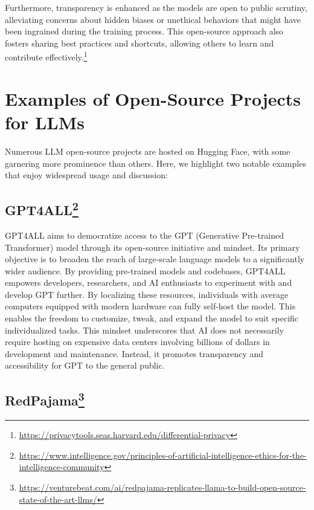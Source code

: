 \documentclass[
]{book}
\begin{document}
Furthermore, transparency is enhanced as the models are open to public scrutiny, alleviating concerns about hidden biases or unethical behaviors that might have been ingrained during the training process. This open-source approach also fosters sharing best practices and shortcuts, allowing others to learn and contribute effectively.\footnote{\url{https://privacytools.seas.harvard.edu/differential-privacy}}

\hypertarget{examples-of-open-source-projects-for-llms}{%
\section{Examples of Open-Source Projects for LLMs}\label{examples-of-open-source-projects-for-llms}}

Numerous LLM open-source projects are hosted on Hugging Face, with some garnering more prominence than others. Here, we highlight two notable examples that enjoy widespread usage and discussion:

\hypertarget{gpt4all2}{%
\subsection[GPT4ALL]{\texorpdfstring{GPT4ALL\footnote{\url{https://www.intelligence.gov/principles-of-artificial-intelligence-ethics-for-the-intelligence-community}}}{GPT4ALL}}\label{gpt4all2}}

GPT4ALL aims to democratize access to the GPT (Generative Pre-trained Transformer) model through its open-source initiative and mindset. Its primary objective is to broaden the reach of large-scale language models to a significantly wider audience. By providing pre-trained models and codebases, GPT4ALL empowers developers, researchers, and AI enthusiasts to experiment with and develop GPT further. By localizing these resources, individuals with average computers equipped with modern hardware can fully self-host the model. This enables the freedom to customize, tweak, and expand the model to suit specific individualized tasks. This mindset underscores that AI does not necessarily require hosting on expensive data centers involving billions of dollars in development and maintenance. Instead, it promotes transparency and accessibility for GPT to the general public.

\hypertarget{redpajama3}{%
\subsection[RedPajama]{\texorpdfstring{RedPajama\footnote{\url{https://venturebeat.com/ai/redpajama-replicates-llama-to-build-open-source-state-of-the-art-llms/}}}{RedPajama}}\label{redpajama3}}
\end{document}
